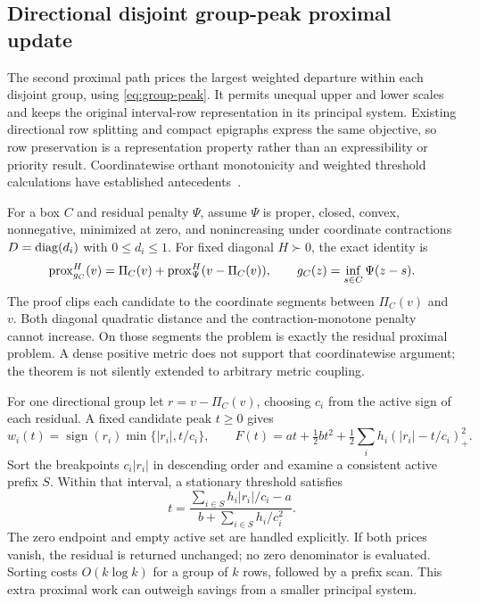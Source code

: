 \subsection{Directional disjoint group-peak proximal update}\label{sec:directional}
The second proximal path prices the largest weighted departure within each
disjoint group, using \eqref{eq:group-peak}. It permits unequal upper and lower
scales and keeps the original interval-row representation in its principal
system. Existing directional row splitting and compact epigraphs express the
same objective, so row preservation is a representation property rather than
an expressibility or priority result. Coordinatewise orthant monotonicity and
weighted threshold calculations have established antecedents~\cite{orthant,weighted}.

For a box $C$ and residual penalty $\Psi$, assume $\Psi$ is proper, closed,
convex, nonnegative, minimized at zero, and nonincreasing under coordinate
contractions $D=\operatorname{diag}(d_i)$ with $0\leq d_i\leq1$. For fixed diagonal $H\succ0$,
the exact identity is
\begin{equation}\label{eq:directional-prox}
 \operatorname{prox}_{g_C}^{H}(v)=\Pi_C(v)+\operatorname{prox}_{\Psi}^{H}(v-\Pi_C(v)),\qquad
 g_C(z)=\inf_{s\in C}\Psi(z-s).
\end{equation}
The proof clips each candidate to the coordinate segments between $\Pi_C(v)$
and $v$. Both diagonal quadratic distance and the contraction-monotone penalty
cannot increase. On those segments the problem is exactly the residual
proximal problem. A dense positive metric does not support that coordinatewise
argument; the theorem is not silently extended to arbitrary metric coupling.

For one directional group let $r=v-\Pi_C(v)$, choosing $c_i$ from the active
sign of each residual. A fixed candidate peak $t\geq0$ gives
\begin{equation}\label{eq:directional-clipping}
 w_i(t)=\operatorname{sign}(r_i)\min\{|r_i|,t/c_i\},\qquad
 F(t)=at+\tfrac12bt^2+\tfrac12\sum_i h_i(|r_i|-t/c_i)_+^2.
\end{equation}
Sort the breakpoints $c_i|r_i|$ in descending order and examine a consistent active prefix $S$.
Within that interval, a stationary threshold satisfies
\begin{equation}\label{eq:directional-threshold}
 t=\frac{\sum_{i\in S}h_i|r_i|/c_i-a}
          {b+\sum_{i\in S}h_i/c_i^2}.
\end{equation}
The zero endpoint and empty active set are handled explicitly. If both prices
vanish, the residual is returned unchanged; no zero denominator is evaluated.
Sorting costs $O(k\log k)$ for a group of $k$ rows, followed by a prefix scan.
This extra proximal work can outweigh savings from a smaller principal system.

